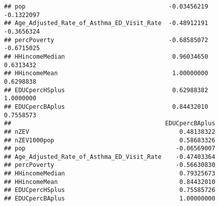 \documentclass[
]{article}
\begin{document}
\begin{verbatim}
## pop                                        -0.03456219     -0.1322097
## Age_Adjusted_Rate_of_Asthma_ED_Visit_Rate  -0.48912191     -0.3656324
## percPoverty                                -0.68585072     -0.6715025
## HHincomeMedian                              0.96034650      0.6313432
## HHincomeMean                                1.00000000      0.6298838
## EDUCpercHSplus                              0.62988382      1.0000000
## EDUCpercBAplus                              0.84432010      0.7558573
##                                           EDUCpercBAplus
## nZEV                                          0.48138322
## nZEV1000pop                                   0.58683326
## pop                                          -0.06569007
## Age_Adjusted_Rate_of_Asthma_ED_Visit_Rate    -0.47403364
## percPoverty                                  -0.56630830
## HHincomeMedian                                0.79325673
## HHincomeMean                                  0.84432010
## EDUCpercHSplus                                0.75585726
## EDUCpercBAplus                                1.00000000
\end{verbatim}
\end{document}
